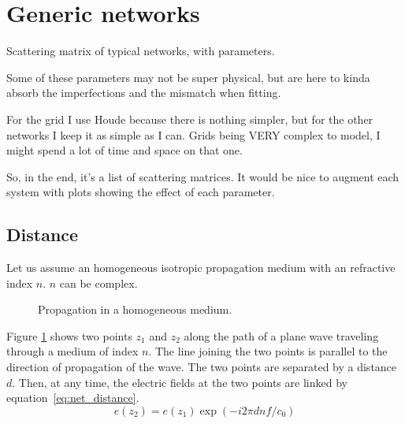 
\section{Generic networks}

Scattering matrix of typical networks, with parameters.

Some of these parameters may not be super physical, but are here to kinda absorb the imperfections and the mismatch when fitting.

For the grid I use Houde \cite{houde_2001} because there is nothing simpler, but for the other networks I keep it as simple as I can.
Grids being VERY complex to model, I might spend a lot of time and space on that one.

So, in the end, it's a list of scattering matrices.  It would be nice to augment each system with plots showing the effect of each parameter.




\subsection{Distance}
Let us assume an homogeneous isotropic propagation medium with an refractive index $n$.
$n$ can be complex.

\begin{figure}[hbtp]
    \centering
    \caption{\label{fig:net_distance} Propagation in a homogeneous medium.}
\end{figure}
Figure \ref{fig:net_distance} shows two points $z_1$ and $z_2$ along the path of a plane wave traveling through a medium of index $n$.
The line joining the two points is parallel to the direction of propagation of the wave.
The two points are separated by a distance $d$.
Then, at any time, the electric fields at the two points are linked by equation~\eqref{eq:net_distance}.
\begin{equation}
    e(z_2) = e(z_1) \exp
    \left(
        - i 2\pi d n f / c_0
    \right)
    \label{eq:net_distance}
\end{equation}

